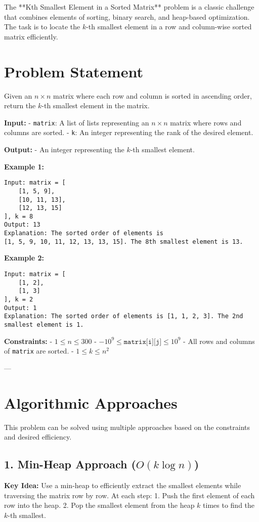 
\label{problem:Kth_Smallest_Element_Sorted_Matrix}

The **Kth Smallest Element in a Sorted Matrix** problem is a classic challenge that combines elements of sorting, binary search, and heap-based optimization. The task is to locate the \(k\)-th smallest element in a row and column-wise sorted matrix efficiently.

\section*{Problem Statement}
Given an \(n \times n\) matrix where each row and column is sorted in ascending order, return the \(k\)-th smallest element in the matrix.

\textbf{Input:}
- \texttt{matrix}: A list of lists representing an \(n \times n\) matrix where rows and columns are sorted.
- \texttt{k}: An integer representing the rank of the desired element.

\textbf{Output:}
- An integer representing the \(k\)-th smallest element.

\textbf{Example 1:}
\begin{verbatim}
Input: matrix = [
    [1, 5, 9],
    [10, 11, 13],
    [12, 13, 15]
], k = 8
Output: 13
Explanation: The sorted order of elements is 
[1, 5, 9, 10, 11, 12, 13, 13, 15]. The 8th smallest element is 13.
\end{verbatim}

\textbf{Example 2:}
\begin{verbatim}
Input: matrix = [
    [1, 2],
    [1, 3]
], k = 2
Output: 1
Explanation: The sorted order of elements is [1, 1, 2, 3]. The 2nd smallest element is 1.
\end{verbatim}

\textbf{Constraints:}
- \(1 \leq n \leq 300\)
- \(-10^9 \leq \texttt{matrix[i][j]} \leq 10^9\)
- All rows and columns of \texttt{matrix} are sorted.
- \(1 \leq k \leq n^2\)

---

\section*{Algorithmic Approaches}

This problem can be solved using multiple approaches based on the constraints and desired efficiency.

\subsection*{1. Min-Heap Approach (\(O(k \log n)\))}
\textbf{Key Idea:}
Use a min-heap to efficiently extract the smallest elements while traversing the matrix row by row. At each step:
1. Push the first element of each row into the heap.
2. Pop the smallest element from the heap \(k\) times to find the \(k\)-th smallest.

